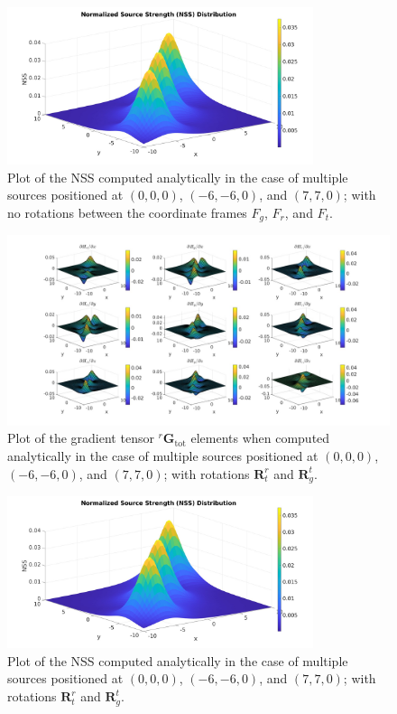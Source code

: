 \begin{figure}
\centering
\includegraphics[width=0.8\textwidth]{images/NSS_multi_anal.jpg}
\caption{Plot of the NSS computed analytically in the case of multiple sources positioned at  $(0,0,0)$, $(-6,-6,0)$, and $(7,7,0)$; with no rotations 
between the coordinate frames \( F_g \), \( F_r \), and \( F_t \).}
\label{fig:NSS_multi_anal}
\end{figure}

\begin{figure}
\hspace*{-0.2\textwidth}
\includegraphics[width=1.4\textwidth]{images/gradients_rotated_multi_anal.jpg}
\caption{Plot of the gradient tensor ${}^r \mathbf{G}_{\text{tot}}$ elements
when computed analytically in the case of multiple sources positioned at  $(0,0,0)$, $(-6,-6,0)$, and $(7,7,0)$;
with rotations $\mathbf{R}^r_t$ and $\mathbf{R}_g^t$. }
\label{fig:gradients_rotated_multi_anal}
\end{figure}

\begin{figure}
\centering
\includegraphics[width=0.8\textwidth]{images/NSS_rotated_multi_anal.jpg}
\caption{Plot of the NSS computed analytically in the case of multiple sources positioned at  $(0,0,0)$, $(-6,-6,0)$, and $(7,7,0)$;
with rotations $\mathbf{R}^r_t$ and $\mathbf{R}_g^t$.}
\label{fig:NSS_rotated_multi_anal}
\end{figure}

